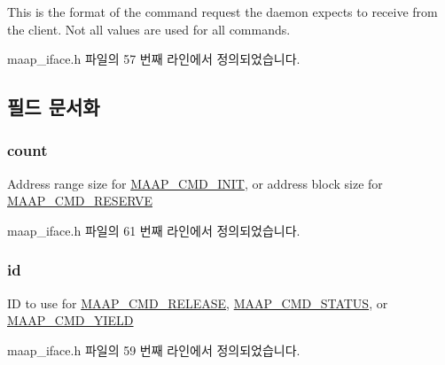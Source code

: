 This is the format of the command request the daemon expects to receive from the client. Not all values are used for all commands. 

maap\+\_\+iface.\+h 파일의 57 번째 라인에서 정의되었습니다.



\subsection{필드 문서화}
\subsubsection[{\texorpdfstring{count}{count}}]{ count}\hypertarget{struct_maap___cmd_a86988a65e0d3ece7990c032c159786d6}{}\label{struct_maap___cmd_a86988a65e0d3ece7990c032c159786d6}
Address range size for \hyperlink{maap__iface_8h_aaf90b1858e10440f7628ac5030e09a5ca25d975d65a26a7a6c06aeadc2b050851}{M\+A\+A\+P\+\_\+\+C\+M\+D\+\_\+\+I\+N\+IT}, or address block size for \hyperlink{maap__iface_8h_aaf90b1858e10440f7628ac5030e09a5cae8b22bb1ae2c72da6c6dc8f687012a3b}{M\+A\+A\+P\+\_\+\+C\+M\+D\+\_\+\+R\+E\+S\+E\+R\+VE} 

maap\+\_\+iface.\+h 파일의 61 번째 라인에서 정의되었습니다.

\subsubsection[{\texorpdfstring{id}{id}}]{ id}\hypertarget{struct_maap___cmd_a2708c0bbb6f926149707c2c61fe43c3e}{}\label{struct_maap___cmd_a2708c0bbb6f926149707c2c61fe43c3e}
ID to use for \hyperlink{maap__iface_8h_aaf90b1858e10440f7628ac5030e09a5caac5c384d911979e439c75cdf53619b5b}{M\+A\+A\+P\+\_\+\+C\+M\+D\+\_\+\+R\+E\+L\+E\+A\+SE}, \hyperlink{maap__iface_8h_aaf90b1858e10440f7628ac5030e09a5ca3943619940c2a994607ee4ddd8d4dabd}{M\+A\+A\+P\+\_\+\+C\+M\+D\+\_\+\+S\+T\+A\+T\+US}, or \hyperlink{maap__iface_8h_aaf90b1858e10440f7628ac5030e09a5ca8fdd70016bf3acf23e57f4c3a5d94d9c}{M\+A\+A\+P\+\_\+\+C\+M\+D\+\_\+\+Y\+I\+E\+LD} 

maap\+\_\+iface.\+h 파일의 59 번째 라인에서 정의되었습니다.

